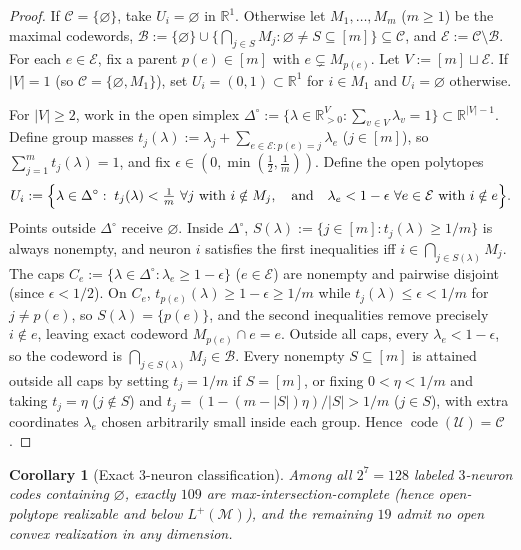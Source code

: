 \documentclass[11pt]{article}
\theoremstyle{plain}
\newtheorem{corollary}[theorem]{Corollary}
\theoremstyle{definition}
\theoremstyle{remark}
\DeclareMathOperator{\code}{code}
\begin{document}
\begin{proof}
If $\mathcal{C} = \{\varnothing\}$, take $U_i = \varnothing$ in $\mathbb{R}^1$. Otherwise let $M_1, \dots, M_m$ ($m \ge 1$) be the maximal codewords, $\mathcal{B} := \{\varnothing\} \cup \{\bigcap_{j \in S} M_j : \varnothing \neq S \subseteq [m]\} \subseteq \mathcal{C}$, and $\mathcal{E} := \mathcal{C} \setminus \mathcal{B}$. For each $e \in \mathcal{E}$, fix a parent $p(e) \in [m]$ with $e \subsetneq M_{p(e)}$. Let $V := [m] \sqcup \mathcal{E}$. If $|V| = 1$ (so $\mathcal{C} = \{\varnothing, M_1\}$), set $U_i = (0, 1) \subset \mathbb{R}^1$ for $i \in M_1$ and $U_i = \varnothing$ otherwise.

For $|V| \ge 2$, work in the open simplex $\Delta^\circ := \{\lambda \in \mathbb{R}_{>0}^V : \sum_{v \in V} \lambda_v = 1\} \subset \mathbb{R}^{|V|-1}$. Define group masses $t_j(\lambda) := \lambda_j + \sum_{e \in \mathcal{E} : p(e) = j} \lambda_e$ ($j \in [m]$), so $\sum_{j=1}^m t_j(\lambda) = 1$, and fix $\epsilon \in (0, \min(\frac{1}{2}, \frac{1}{m}))$. Define the open polytopes
\[
U_i := \Bigl\{\lambda \in \Delta^\circ :\; t_j(\lambda) < \tfrac{1}{m}\ \forall j \text{ with } i \notin M_j,\quad \text{and}\quad \lambda_e < 1 - \epsilon\ \forall e \in \mathcal{E} \text{ with } i \notin e\Bigr\}.
\]
Points outside $\Delta^\circ$ receive $\varnothing$. Inside $\Delta^\circ$, $S(\lambda) := \{j \in [m] : t_j(\lambda) \ge 1/m\}$ is always nonempty, and neuron $i$ satisfies the first inequalities iff $i \in \bigcap_{j \in S(\lambda)} M_j$. The caps $C_e := \{\lambda \in \Delta^\circ : \lambda_e \ge 1 - \epsilon\}$ ($e \in \mathcal{E}$) are nonempty and pairwise disjoint (since $\epsilon < 1/2$). On $C_e$, $t_{p(e)}(\lambda) \ge 1 - \epsilon \ge 1/m$ while $t_j(\lambda) \le \epsilon < 1/m$ for $j \neq p(e)$, so $S(\lambda) = \{p(e)\}$, and the second inequalities remove precisely $i \notin e$, leaving exact codeword $M_{p(e)} \cap e = e$. Outside all caps, every $\lambda_e < 1 - \epsilon$, so the codeword is $\bigcap_{j \in S(\lambda)} M_j \in \mathcal{B}$. Every nonempty $S \subseteq [m]$ is attained outside all caps by setting $t_j = 1/m$ if $S = [m]$, or fixing $0 < \eta < 1/m$ and taking $t_j = \eta$ ($j \notin S$) and $t_j = (1 - (m - |S|)\eta)/|S| > 1/m$ ($j \in S$), with extra coordinates $\lambda_e$ chosen arbitrarily small inside each group. Hence $\code(\mathcal{U}) = \mathcal{C}$.
\end{proof}

\begin{corollary}[Exact $3$-neuron classification]\label{cor:3neuron}
Among all $2^7 = 128$ labeled $3$-neuron codes containing $\varnothing$, exactly $109$ are max-intersection-complete (hence open-polytope realizable and below $L^+(\mathcal{M})$), and the remaining $19$ admit no open convex realization in any dimension.
\end{corollary}
\end{document}
